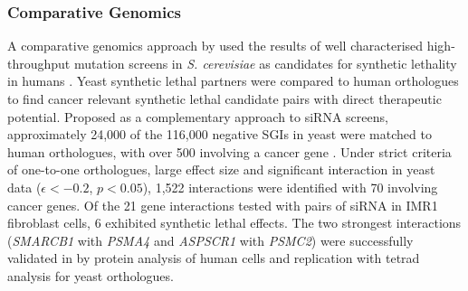\subsubsection{Comparative Genomics}

A comparative genomics approach by \citet{Deshpande2013} used the results of well characterised high-throughput mutation screens in \textit{S. cerevisiae} as candidates for synthetic lethality in humans \citep{Baryshnikova2010a, Costanzo2010, Costanzo2011, Tong2001, Tong2004}. Yeast synthetic lethal partners were compared to human orthologues to find cancer relevant synthetic lethal candidate pairs with direct therapeutic potential. Proposed as a complementary approach to siRNA screens, approximately 24,000 of the 116,000 negative SGIs in yeast \citep{Costanzo2011} were matched to human orthologues, with over 500 involving a cancer gene \citep{Futreal2004}. Under strict criteria of one-to-one orthologues, large effect size and significant interaction in yeast data ($\epsilon < -0.2$, $p < 0.05$), 1,522 interactions were identified with 70 involving cancer genes. Of the 21 gene interactions tested with pairs of siRNA in IMR1 fibroblast cells, 6 exhibited synthetic lethal effects. The two strongest interactions (\textit{SMARCB1} with \textit{PSMA4} and \textit{ASPSCR1} with \textit{PSMC2}) were successfully validated in by protein analysis of human cells and replication with tetrad analysis for yeast orthologues.

